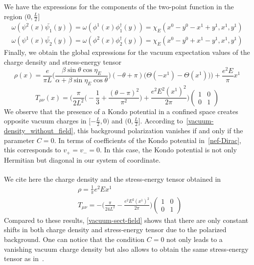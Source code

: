 We have the expressions for the components of the two-point function in the region $(0, \frac{L}{2}]$
\begin{equation*}
\begin{split}
\omega(\psi^2(x) \bar{\psi_1}(y)) = 
\omega(\phi^1(x) \phi^\dagger_1(y)) = \chi_E(x^0 - y^0 - x^1 + y^1, x^1, y^1) \\
 \omega(\psi^1(x) \bar{\psi_2}(y)) = 
\omega(\phi^2(x) \phi^\dagger_2(y)) = \chi_E(x^0 - y^0 + x^1 - y^1, x^1, y^1)
\end{split}
\end{equation*}
Finally, we obtain the global expressions for the vacuum expectation values of the charge density and stress-energy tensor 
\begin{equation}
\rho(x) = \frac{e}{\pi L}\Big( \frac{\beta \sin \theta \cos \eta_E}{\alpha + \beta \sin \eta_E \cos \theta}\Big) (-\theta + \pi)
\Big(\Theta(- x^1) - \Theta(x^1))\Big) + \frac{e^2 E}{\pi} x^1
\end{equation}
\begin{equation}
T_{\mu\nu}(x) = 
\bigg( \frac{\pi}{2L^2}\big( -\frac{1}{3} + \frac{(\theta - \pi)^2}{\pi^2}\big) + \frac{e^2E^2(x^1)^2}{2 \pi} \bigg)
\begin{pmatrix}
1 & 0 \\ 0 & 1
\end{pmatrix}
\end{equation}
%
We observe that the presence of a Kondo potential in a confined space creates opposite vacuum charges in $[-\frac L 2, 0)$ and $(0, \frac L 2]$.
According to~\cref{vacuum-density_without_field}, 
this background polarization vanishes if and only if the parameter $C = 0$. 
In terms of coefficients of the Kondo potential in~\cref{nef-Dirac},
this corresponds to $v_+ = v_- = 0$.
In this case, the Kondo potential is not only Hermitian but diagonal in our system of coordinate. \\\\
%
We cite here the charge density and the stress-energy tensor obtained in~\cite{Zahn2015}
\begin{equation*}
\begin{split}
& \rho = \frac 1 \pi e^2 Ex^1 \\
& T_{\mu\nu} = - \big( \frac{\pi}{24L^2} - \frac{e^2 E^2 (x^1)^2}{2\pi}\big) \begin{pmatrix} 1 & 0 \\ 0 & 1 \end{pmatrix}
\end{split}
\end{equation*}
Compared to these results, 
\cref{vacuum-sect-field} shows that there are only constant shifts in both charge density and stress-energy tensor due to the polarized background.
One can notice that the condition $C = 0$ not only leads to a vanishing vacuum charge density but also allows to obtain the same stress-energy tensor as in~\cite{Zahn2015}.
